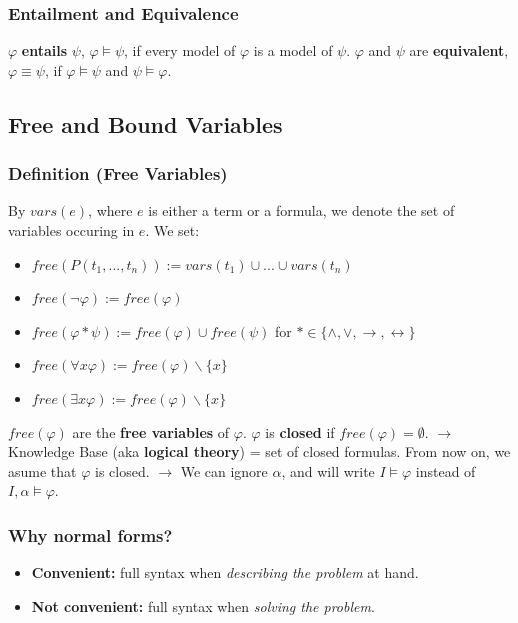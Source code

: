 \documentclass[conference]{styles/acmsiggraph}
\begin{document}
        \subsubsection{Entailment and Equivalence}
            $\varphi$ \textbf{entails} $\psi$, $\varphi \vDash \psi$, if every model of $\varphi$ is a model of $\psi$.\newline
            $\varphi$ and $\psi$ are \textbf{equivalent}, $\varphi \equiv \psi$, if $\varphi \vDash \psi$ and $\psi \vDash \varphi$.
            
            
    \subsection{Free and Bound Variables}
        \subsubsection{Definition (Free Variables)}
            By $vars(e)$, where $e$ is either a term or a formula, we denote the set of variables occuring in $e$. We set:
            \begin{itemize}
                \item $free(P(t_1,...,t_n)) := vars(t_1) \cup ... \cup vars(t_n)$
                \item $free(\lnot \varphi) := free(\varphi)$
                \item $free(\varphi \ast \psi) := free(\varphi) \cup free(\psi)$ for $\ast \in \{\wedge,\vee,\rightarrow,\leftrightarrow\}$
                \item $free(\forall x \varphi) := free(\varphi) \backslash \{x\}$
                \item $free(\exists x \varphi) := free(\varphi) \backslash \{x\}$
            \end{itemize}
            $free(\varphi)$ are the \textbf{free variables} of $\varphi$. $\varphi$ is \textbf{closed} if $free(\varphi) = \emptyset$.\newline
            $\rightarrow$ Knowledge Base (aka \textbf{logical theory}) = set of closed formulas. From now on, we asume that $\varphi$ is closed.\newline
            $\rightarrow$ We can ignore $\alpha$, and will write $I \vDash \varphi$ instead of $I, \alpha \vDash \varphi$.
\newpage            
            
        \subsubsection{Why normal forms?}
            \begin{itemize}
                \item \textbf{Convenient:} full syntax when \textit{describing the problem} at hand.
                \item \textbf{Not convenient:} full syntax when \textit{solving the problem}.
            \end{itemize}
        
\end{document}
